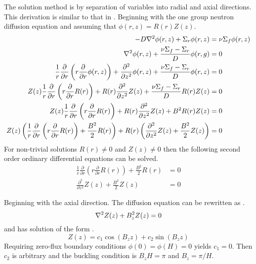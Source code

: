   The solution method is by separation of variables into radial and axial 
  directions. This derivation is similar to that in .
  Beginning with the one group neutron diffusion equation  and assuming
  that  $\phi(r,z) = R(r) Z(z)$.
  \begin{align}
    -D \mathbf{\nabla}^2 \phi(r,z) + \Sigma_r \phi(r,z) &= \nu \Sigma_f \phi(r,z) \\
    \mathbf{\nabla}^2 \phi(r,z) + \frac{\nu\Sigma_f - \Sigma_r}{D} \phi(r,g) &= 0 \\
    \frac{1}{r} \frac{\partial}{\partial r} \left( r \frac{\partial}{\partial r}
      \phi(r,z) \right) + \frac{\partial^2}{\partial z^2} \phi(r,z) +
      \frac{\nu\Sigma_f - \Sigma_r}{D} \phi(r,z) &= 0 \\
    Z(z) \frac{1}{r} \frac{\partial}{\partial r} \left( r 
      \frac{\partial}{\partial r} R(r) \right) + 
      R(r) \frac{\partial^2}{\partial z^2} Z(z) + 
      \frac{\nu\Sigma_f - \Sigma_r}{D} R(r) Z(z) &= 0 \\
    Z(z) \frac{1}{r} \frac{\partial}{\partial r} \left( r 
      \frac{\partial}{\partial r} R(r) \right) + 
      R(r) \frac{\partial^2}{\partial z^2} Z(z) + 
      B^2 R(r) Z(z) &= 0 \\
    Z(z) \left( \frac{1}{r} \frac{\partial}{\partial r} \left( r 
      \frac{\partial}{\partial r} R(r) \right) + \frac{B^2}{2} R(r) \right) + 
      R(r) \left( \frac{\partial^2}{\partial z^2} Z(z) + \frac{B^2}{2} Z(z) 
      \right) &= 0
  \end{align}
  For non-trivial solutions $R(r) \ne 0$ and $Z(z) \ne 0$ then the following
  second order ordinary differential equations can be solved.
  \begin{align}
    \label{eq:cyl_radialR}
    \frac{1}{r} \frac{\partial}{\partial r} \left( r \frac{\partial}{\partial r}
      R(r) \right) + \frac{B^2}{2} R(r) &= 0 \\
    \label{eq:cyl_axialZ}
    \frac{\partial^2}{\partial z^2} Z(z) + \frac{B^2}{2} Z(z) &= 0
  \end{align}
  
  Beginning with the axial direction. The diffusion equation can be rewritten as 
  .
  \begin{equation} \label{eq:simplediffusion}
    \mathbf{\nabla}^2 Z(z) + B_z^2 Z(z) = 0
  \end{equation}
  and has solution of the form .
  \begin{equation} \label{eq:cyl_axial}
    Z(z) = c_1 \cos(B_z z) + c_2 \sin(B_z z)
  \end{equation}
  Requiring zero-flux boundary conditions $\phi(0)=\phi(H)=0$ yields $c_1=0$. 
  Then $c_2$ is arbitrary and the buckling condition is $B_zH=\pi$ and $B_z=\pi/H$.
  
